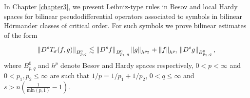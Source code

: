 In Chapter \ref{chapter3}, we present Leibniz-type rules in Besov and local Hardy spaces for bilinear pseudodifferential operators associated to symbols in bilinear H\"ormander classes of critical order. For such symbols we prove bilinear estimates of the form 

\begin{equation}
\left\|D^s T_\sigma(f,g)\right\|_{B^0_{p,q}} \lesssim \left\|D^s f\right\|_{B^0_{p_1,q}} \left\|g\right\|_{h^{p_2}} + \left\|f\right\|_{h^{p_1}}\left\|D^s g\right\|_{B^0_{p_2,q}},
\end{equation}
where $B^0_{p,q}$ and $h^p$ denote Besov and Hardy spaces respectively, $0<p<\infty$ and $0<p_1,p_2\leq\infty$ are such that $1/p = 1/p_1 + 1/p_2$, $0<q\leq\infty$ and $s>n(\frac{1}{\text{min}(p,1)} - 1)$.



